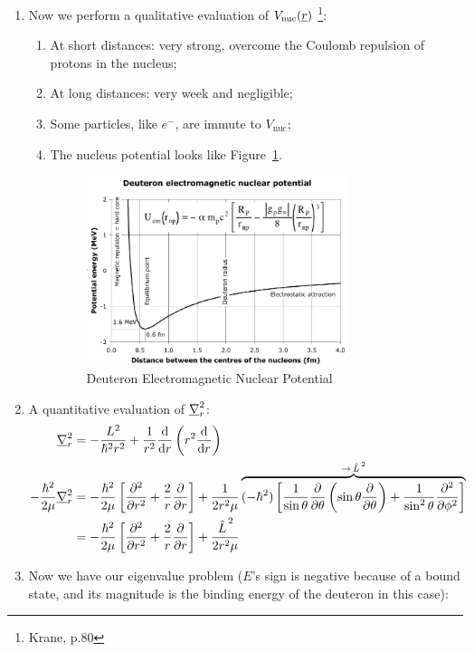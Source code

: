 \documentclass{school-22.101-notes}
\begin{document}
\begin{enumerate}
\item Now we perform a qualitative evaluation of $V_{\mathrm{nuc}} (\underline{r})$ \footnote{Krane, p.80}: 
    \begin{enumerate}
    \item At short distances: very strong, overcome the Coulomb repulsion of protons in the nucleus; 
    \item At long distances: very week and negligible; 
    \item Some particles, like $e^-$, are immute to $V_{\mathrm{nuc}}$;
    \item The nucleus potential looks like Figure~\ref{nuclear-potential-radius}. 
    \begin{figure}
        \centering
        \includegraphics[width=3in]{images/deuteron/nuclear-potential-radius.png}
        \caption{Deuteron Electromagnetic Nuclear Potential\label{nuclear-potential-radius}}
    \end{figure}
    \end{enumerate}

\item A quantitative evaluation of $\underline{\nabla}_r^2$: 
\begin{align}
\underline{\nabla}_r^2 &= - \frac{L^2}{\hbar^2 r^2} + \frac{1}{r^2} \frac{\mathrm{d}}{\mathrm{d}r} \left( r^2 \frac{\mathrm{d}}{\mathrm{d}r} \right) \\
- \frac{\hbar^2}{2 \mu} \underline{\nabla}_r^2 &= - \frac{\hbar^2}{2 \mu} \left[ \frac{\partial^{2} }{\partial r ^{2}} + \frac{2}{r} \frac{\partial}{\partial r} \right] + \frac{1}{2 r^2 \mu} \overbrace{ (-\hbar^2) \left[ \frac{1}{\sin \theta} \frac{\partial}{\partial \theta} \left( \sin \theta \frac{\partial}{\partial \theta} \right) + \frac{1}{\sin^2 \theta} \frac{\partial^{2} }{\partial \phi ^{2}} \right]}^{\to \left. \hat{L} \right.^2}  \\
&= - \frac{\hbar^2}{2 \mu} \left[ \frac{\partial^{2} }{\partial r ^{2}} + \frac{2}{r} \frac{\partial}{\partial r} \right] + \frac{\left. \hat{L} \right.^2}{2 r^2 \mu} 
\end{align}

\item Now we have our eigenvalue problem ($E$'s sign is negative because of a bound state, and its magnitude is the binding energy of the deuteron in this case):


\end{enumerate}
\end{document}
